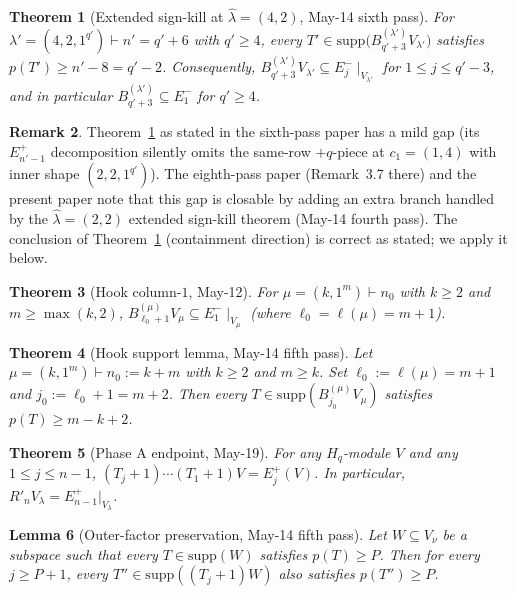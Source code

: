 \documentclass[11pt]{article}
\newtheorem{theorem}{Theorem}
\newtheorem{lemma}[theorem]{Lemma}
\theoremstyle{definition}
\newtheorem{remark}[theorem]{Remark}
\newcommand{\Hq}{H_q}
\newcommand{\hatl}{\widehat\lambda}
\newcommand{\supp}{\mathrm{supp}}
\newcommand{\Rp}{{R'}}
\begin{document}
\begin{theorem}[Extended sign-kill at $\hatl = (4, 2)$, May-14 sixth pass]\label{thm:42-prefix}
For $\lambda' = (4, 2, 1^{q'}) \vdash n' = q' + 6$ with $q' \ge 4$,
every $T' \in \supp\bigl(B^{(\lambda')}_{q'+3} V_{\lambda'}\bigr)$
satisfies $p(T') \ge n' - 8 = q' - 2$.  Consequently,
$B^{(\lambda')}_{q'+3} V_{\lambda'} \subseteq E_j^-\!\mid_{V_{\lambda'}}$
for $1 \le j \le q' - 3$, and in particular $B^{(\lambda')}_{q'+3} \subseteq E_1^-$
for $q' \ge 4$.
\end{theorem}

\begin{remark}\label{rem:42-gap}
Theorem~\ref{thm:42-prefix} as stated in the sixth-pass paper has a mild
gap (its $E_{n'-1}^+$ decomposition silently omits the same-row $+q$-piece
at $c_1 = (1, 4)$ with inner shape $(2, 2, 1^{q'})$).  The eighth-pass
paper (Remark~3.7 there) and the present paper note that this gap is
closable by adding an extra branch handled by the $\hatl = (2, 2)$
extended sign-kill theorem (May-14 fourth pass).  The conclusion of
Theorem~\ref{thm:42-prefix} (containment direction) is correct as
stated; we apply it below.
\end{remark}

\begin{theorem}[Hook column-$1$, May-12]\label{thm:hook-E1minus}
For $\mu = (k, 1^m) \vdash n_0$ with $k \ge 2$ and $m \ge \max(k, 2)$,
$B^{(\mu)}_{\ell_0+1} V_\mu \subseteq E_1^-\!\mid_{V_\mu}$ (where
$\ell_0 = \ell(\mu) = m + 1$).
\end{theorem}

\begin{theorem}[Hook support lemma, May-14 fifth pass]\label{thm:hook-support}
Let $\mu = (k, 1^m) \vdash n_0 := k + m$ with $k \ge 2$ and $m \ge k$.
Set $\ell_0 := \ell(\mu) = m + 1$ and $j_0 := \ell_0 + 1 = m + 2$.
Then every $T \in \supp(B^{(\mu)}_{j_0} V_\mu)$ satisfies
$p(T) \ge m - k + 2$.
\end{theorem}

\begin{theorem}[Phase A endpoint, May-19]\label{thm:phaseA}
For any $\Hq$-module $V$ and any $1 \le j \le n-1$,
$(T_j+1)\cdots(T_1+1) V = E_j^+(V)$.  In particular,
$\Rp_n V_\lambda = E_{n-1}^+|_{V_\lambda}$.
\end{theorem}

\begin{lemma}[Outer-factor preservation, May-14 fifth pass]\label{lem:outer-preserve}
Let $W \subseteq V_\nu$ be a subspace such that every $T \in \supp(W)$
satisfies $p(T) \ge P$.  Then for every $j \ge P + 1$,
every $T'' \in \supp((T_j{+}1) W)$ also satisfies $p(T'') \ge P$.
\end{lemma}
\end{document}
